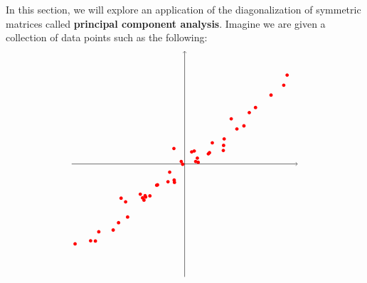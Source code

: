 In this section, we will explore an application of the diagonalization
of symmetric matrices called \textbf{principal component analysis}.
Imagine we are given a collection of data points such as the
following:
\begin{equation}\label{eqn:subspace-fitting}
  \begin{tikzpicture}[baseline=-0.5ex]
    \draw[thin,->] (-4,0) -- (4,0);
    \draw[thin,->] (0,-4) -- (0,4);
    \fill[color=red] (-2.25,-1.21) circle (0.06);
    \fill[color=red] (-1.44,-1.28) circle (0.06);
    \fill[color=red] (2.29,1.82) circle (0.06);
    \fill[color=red] (0.25,0.43) circle (0.06);
    \fill[color=red] (-1.57,-1.07) circle (0.06);
    \fill[color=red] (2.51,2.00) circle (0.06);
    \fill[color=red] (-2.53,-2.34) circle (0.06);
    \fill[color=red] (-3.04,-2.40) circle (0.06);
    \fill[color=red] (0.84,0.36) circle (0.06);
    \fill[color=red] (-3.16,-2.73) circle (0.06);
    \fill[color=red] (-2.02,-1.88) circle (0.06);
    \fill[color=red] (3.06,2.44) circle (0.06);
    \fill[color=red] (-1.40,-1.12) circle (0.06);
    \fill[color=red] (-2.09,-1.34) circle (0.06);
    \fill[color=red] (-1.23,-1.13) circle (0.06);
    \fill[color=red] (0.48,0.06) circle (0.06);
    \fill[color=red] (-1.49,-1.20) circle (0.06);
    \fill[color=red] (0.98,0.75) circle (0.06);
    \fill[color=red] (1.40,0.89) circle (0.06);
    \fill[color=red] (-0.12,0.09) circle (0.06);
    \fill[color=red] (0.88,0.40) circle (0.06);
    \fill[color=red] (-0.38,0.55) circle (0.06);
    \fill[color=red] (0.34,0.46) circle (0.06);
    \fill[color=red] (0.45,0.21) circle (0.06);
    \fill[color=red] (-0.59,-0.63) circle (0.06);
    \fill[color=red] (-0.53,-0.29) circle (0.06);
    \fill[color=red] (2.10,1.35) circle (0.06);
    \fill[color=red] (1.65,1.60) circle (0.06);
    \fill[color=red] (-3.88,-2.83) circle (0.06);
    \fill[color=red] (-0.07,-0.01) circle (0.06);
    \fill[color=red] (-0.37,-0.57) circle (0.06);
    \fill[color=red] (-0.99,-0.75) circle (0.06);
    \fill[color=red] (-2.34,-2.08) circle (0.06);
    \fill[color=red] (3.63,3.15) circle (0.06);
    \fill[color=red] (1.37,0.48) circle (0.06);
    \fill[color=red] (-0.96,-0.74) circle (0.06);
    \fill[color=red] (3.51,2.79) circle (0.06);
    \fill[color=red] (-3.33,-2.72) circle (0.06);
    \fill[color=red] (0.39,0.09) circle (0.06);
    \fill[color=red] (-1.38,-1.17) circle (0.06);
    \fill[color=red] (-0.36,-0.65) circle (0.06);
    \fill[color=red] (1.38,0.66) circle (0.06);
    \fill[color=red] (1.85,1.24) circle (0.06);

\end{tikzpicture}
\end{equation}
